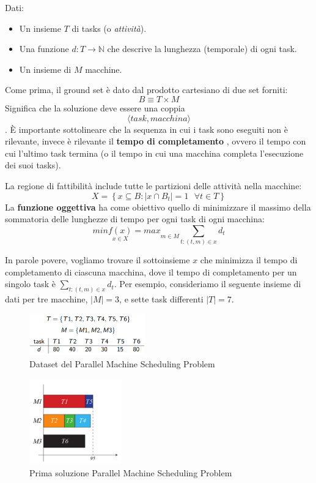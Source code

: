 \documentclass{article}
\begin{document}
Dati:
\begin{itemize}
    \item Un insieme $T$ di tasks (o \textit{attività}).
    \item Una funzione $d:T \rightarrow \mathbb{N}$ che descrive la lunghezza (temporale) di ogni task.
    \item Un insieme di $M$ macchine.
\end{itemize}

Come prima, il ground set è dato dal prodotto cartesiano di due set forniti:
$$B\equiv T\times M$$
Significa che la soluzione deve essere una coppia $$\langle task,macchina\rangle$$. È importante
sottolineare che la sequenza in cui i task sono eseguiti non è rilevante, invece è rilevante il \textbf{tempo di completamento}
, ovvero il tempo con cui l'ultimo task termina (o il tempo in cui una macchina completa l'esecuzione dei suoi tasks).

La regione di fattibilità include tutte le partizioni delle attività nella macchine:
$$X=\left\{ x\subseteq B : |x\cap B_t|=1 \text{ } \forall t \in T \right\} $$
La \textbf{funzione oggettiva} ha come obiettivo quello di minimizzare il massimo della sommatoria delle lunghezze di tempo per ogni task di ogni macchina:
$$min\underset{x\in X}{f(x)}=max\underset{m\in M}{}\sum_{t:(t,m)\in x} d_t$$

In parole povere, vogliamo trovare il sottoinsieme $x$ che minimizza il tempo di completamento di ciascuna
macchina, dove il tempo di completamento per un singolo task è $\sum_{t:(t,m)\in x} d_t$.
\newline
Per esempio, consideriamo il seguente insieme di dati per tre macchine, $|M|=3$, e sette task differenti $|T|=7$.

\begin{figure}[H]
    \centering
    \includegraphics[width=5cm]{images/dataset_PMSP.png}
    \caption{Dataset del Parallel Machine Scheduling Problem}
    \label{fig:dataset_PMSP}
\end{figure}

\begin{figure}[H]
    \centering
    \includegraphics[width=4cm]{images/sol1_PMSP.png}
    \caption{Prima soluzione Parallel Machine Scheduling Problem}
    \label{fig:sol1_PMSP}
\end{figure}
\end{document}
